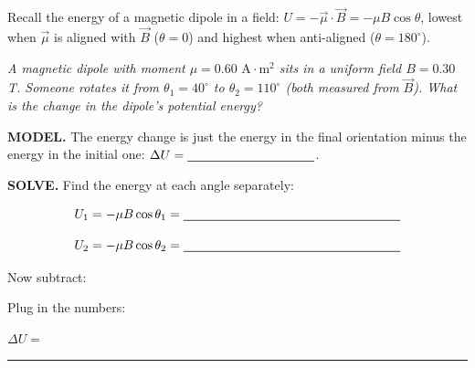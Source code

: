 \documentclass[12pt]{article}
\newcommand{\eqline}[2][-0.5mm]{%
  \par\vspace{1mm}\noindent #2\par\vspace{#1}%
  \noindent\textcolor{rulehue}{\rule{\linewidth}{0.5pt}}\par\vspace{4mm}%
}
\begin{document}

Recall the energy of a magnetic dipole in a field: $U=-\vec\mu\cdot
\vec B=-\mu B\cos\theta$, lowest when $\vec\mu$ is aligned with
$\vec B$ ($\theta=0$) and highest when anti-aligned ($\theta=180^\circ$).

\textit{A magnetic dipole with moment $\mu=0.60\text{ A}{\cdot}\text{m}^2$
sits in a uniform field $B=0.30$ T. Someone rotates it from
$\theta_1=40^\circ$ to $\theta_2=110^\circ$ (both measured from
$\vec B$). What is the \emph{change} in the dipole's potential energy?}

\textbf{MODEL.} The energy change is just the energy in the final
orientation minus the energy in the initial one:
$\Delta U = \bl[3.5cm]$.

\textbf{SOLVE.} Find the energy at each angle separately:

\[
U_1 = -\mu B\cos\theta_1 = \bl[6cm]
\]

\[
U_2 = -\mu B\cos\theta_2 = \bl[6cm]
\]

Now subtract:


Plug in the numbers:

\eqline[0.2cm]{$\Delta U = $}

\end{document}
